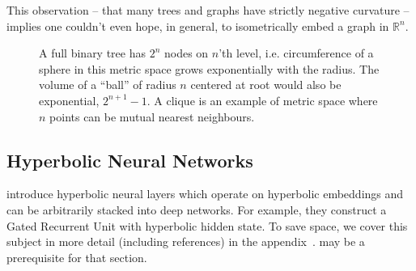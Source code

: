 This observation -- that many trees and graphs have strictly negative curvature --
implies one couldn't even hope, in general, to isometrically embed a graph in \(
\mathbb{R}^n \).

\begin{figure}[ht]
    \centering
    \hfill
    \hfill
    \hfill
    \caption{A full binary tree has \( 2^n \) nodes on \( n \)'th level, i.e.
    circumference of a sphere in this metric space grows exponentially with the
    radius. The volume of a ``ball'' of radius \( n \) centered at root would
    also be exponential, \( 2^{n+1} - 1 \).
    A clique is an example of metric space where \( n \) points
    can be mutual nearest neighbours.
    }
\end{figure}

\subsection*{Hyperbolic Neural Networks}

\citet{ganeaHNNs} introduce hyperbolic neural layers which operate on
hyperbolic embeddings and can be arbitrarily stacked into deep networks.
For example, they construct a Gated Recurrent Unit with hyperbolic hidden
state.
To save space, we cover this subject in more detail (including references) in
the appendix~.  may be a
prerequisite for that section.


